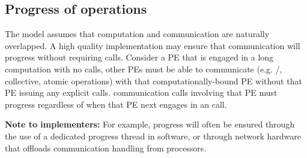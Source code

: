 \subsection{Progress of \openshmem operations}
The \openshmem model assumes that computation and communication are
naturally overlapped.  
A high quality \openshmem{} implementation may ensure that communication will
progress without requiring \openshmem{} calls. 
Consider a \ac{PE} that is engaged in a long computation with no \openshmem calls, other \ac{PE}s must be able to communicate (e.g. \PUT{}/\GET{},
collective, atomic operations) with that computationally-bound \ac{PE} without that \ac{PE}
issuing any explicit \openshmem calls. \openshmem communication calls involving that \ac{PE} must progress
regardless of when that \ac{PE} next engages in an \openshmem call.

\textbf{Note to implementers:} For example, progress will often be ensured through
the use of a dedicated progress thread in software, or through
network hardware that offloads communication handling from processors.


